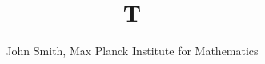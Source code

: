 \documentclass{amsart}
\begin{document}
\title{T}
\author{John Smith, Max Planck Institute for Mathematics}
\maketitle
\end{document}
